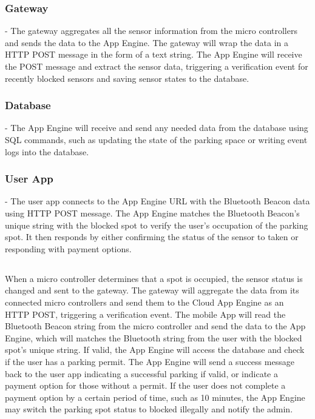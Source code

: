 \documentclass{article}
\begin{document}
\subsubsection{\textbf{Gateway}} - The gateway aggregates all the sensor information from the micro controllers and sends the data to the App Engine. The gateway will wrap the data in a HTTP POST message in the form of a text string. The App Engine will receive the POST message and extract the sensor data, triggering a verification event for recently blocked sensors and saving sensor states to the database.
\subsubsection{\textbf{Database}} - The App Engine will receive and send any needed data from the database using SQL commands, such as updating the state of the parking space or writing event logs into the database.
\subsubsection{\textbf{User App}} - The user app connects to the App Engine URL with the Bluetooth Beacon data using HTTP POST message. The App Engine matches the Bluetooth Beacon's unique string with the blocked spot to verify the user's occupation of the parking spot. It then responds by either confirming the status of the sensor to taken or responding with payment options.
\subsection*{} When a micro controller determines that a spot is occupied, the sensor status is changed and sent to the gateway. The gateway will aggregate the data from its connected micro controllers and send them to the Cloud App Engine as an HTTP POST, triggering a verification event. The mobile App will read the Bluetooth Beacon string from the micro controller and send the data to the App Engine, which will matches the Bluetooth string from the user with the blocked spot's unique string. If valid, the App Engine will access the database and check if the user has a parking permit. The App Engine will send a success message back to the user app indicating a successful parking if valid, or indicate a payment option for those without a permit. If the user does not complete a payment option by a certain period of time, such as 10 minutes, the App Engine may switch the parking spot status to blocked illegally and notify the admin.
\end{document}
